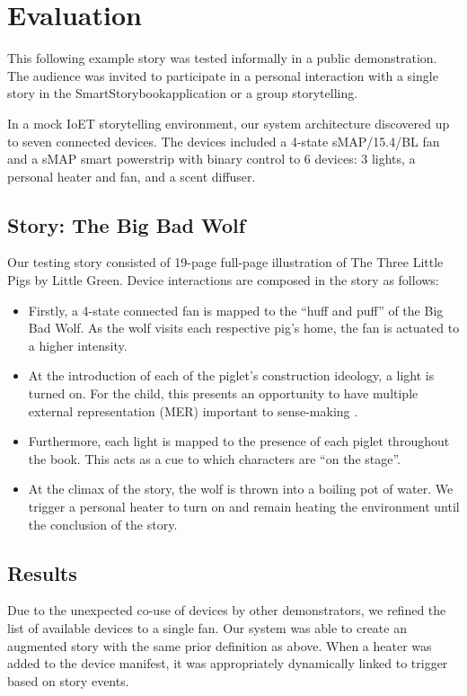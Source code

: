 \documentclass{sigchi}
\newcommand\name{SmartStorybook}
\begin{document}



\section{Evaluation}
This following example story was tested informally in a public demonstration. The audience was invited to participate in a personal interaction with a single story in the \name application or a group storytelling. 

In a mock IoET storytelling environment, our system architecture discovered up to seven connected devices. The devices included a 4-state sMAP/15.4/BL fan and a sMAP smart powerstrip with binary control to 6 devices: 3 lights, a personal heater and fan, and a scent diffuser.  

\subsection{Story: The Big Bad Wolf}
Our testing story consisted of 19-page full-page illustration of The Three Little Pigs by Little Green. Device interactions are composed in the story as follows:
\begin{itemize}
\item Firstly, a 4-state connected fan is mapped to the ``huff and puff'' of the Big Bad Wolf. As the wolf visits each respective pig's home, the fan is actuated to a higher intensity. 
\item At the introduction of each of the piglet's construction ideology, a light is turned on. For the child, this presents an opportunity to have multiple external representation (MER) important to sense-making \cite{ainsworth_deft:_2006}. 
\item Furthermore, each light is mapped to the presence of each piglet throughout the book. This acts as a cue to which characters are ``on the stage''. 
\item At the climax of the story, the wolf is thrown into a boiling pot of water. We trigger a personal heater to turn on and remain heating the environment until the conclusion of the story. 
\end{itemize}
\subsection{Results}
Due to the unexpected co-use of devices by other demonstrators, we refined the list of available devices to a single fan. Our system was able to create an augmented story with the same prior definition as above. When a heater was added to the device manifest, it was appropriately dynamically linked to trigger based on story events. 
\end{document}
